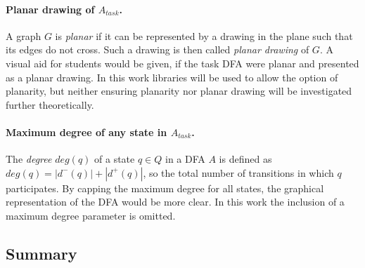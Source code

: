 \paragraph*{Planar drawing of $A_{task}$.}

A graph $G$ is \emph{planar} if it can be represented by a drawing in the plane such that its edges do not cross. Such a drawing is then called \emph{planar drawing} of $G$. A visual aid for students would be given, if the task DFA were planar and presented as a planar drawing. In this work libraries will be used to allow the option of planarity, but neither ensuring planarity nor planar drawing will be investigated further theoretically.

\paragraph*{Maximum degree of any state in $A_{task}$.}

The \emph{degree} $deg(q)$ of a state $q \in Q$ in a DFA $A$ is defined as $deg(q) = |d^-(q)| + |d^+(q)|$, so the total number of transitions in which $q$ participates. By capping the maximum degree for all states, the graphical representation of the DFA would be more clear. In this work the inclusion of a maximum degree parameter is omitted.


\subsection{Summary}

